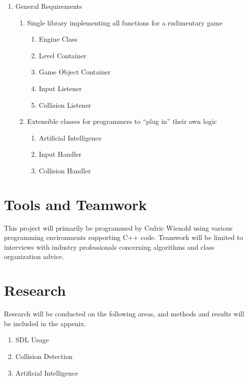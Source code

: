 \documentclass[12pt]{article}
\begin{document}
\begin{enumerate}
  \item General Requirements

  \begin{enumerate}
    \item Single library implementing all functions for a rudimentary game

    \begin{enumerate}
      \item Engine Class
      \item Level Container
      \item Game Object Container
      \item Input Listener
      \item Collision Listener
    \end{enumerate}

    \item Extensible classes for programmers to ``plug in'' their own logic

    \begin{enumerate}
      \item Artificial Intelligence
      \item Input Handler
      \item Collision Handler
    \end{enumerate}

  \end{enumerate}
\end{enumerate}



  \section{Tools and Teamwork}
    This project will primarily be programmed by Cedric Wienold using various programming environments supporting C++ code. Teamwork will be limited to interviews with industry professionals concerning algorithms and class organization advice.

  \section{Research}
    Research will be conducted on the following areas, and methods and results will be included in the appenix.

\begin{enumerate}
  \item SDL Usage
  \item Collision Detection
  \item Artificial Intelligence
\end{enumerate}
\end{document}
